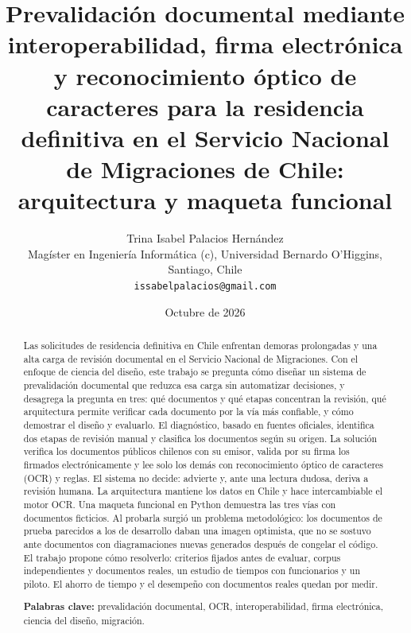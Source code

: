 \documentclass[11pt,a4paper]{article}
\title{\textbf{Prevalidación documental mediante interoperabilidad, firma electrónica y reconocimiento óptico de caracteres para la residencia definitiva en el Servicio Nacional de Migraciones de Chile: arquitectura y maqueta funcional}}
\author{Trina Isabel Palacios Hernández\\[2pt]
\small Magíster en Ingeniería Informática (c), Universidad Bernardo O'Higgins, Santiago, Chile\\
\small \texttt{issabelpalacios@gmail.com}}
\date{Octubre de 2026}
\begin{document}
\maketitle

\begin{abstract}
\noindent
Las solicitudes de residencia definitiva en Chile enfrentan demoras prolongadas y una alta carga de revisión documental en el Servicio Nacional de Migraciones. Con el enfoque de ciencia del diseño, este trabajo se pregunta cómo diseñar un sistema de prevalidación documental que reduzca esa carga sin automatizar decisiones, y desagrega la pregunta en tres: qué documentos y qué etapas concentran la revisión, qué arquitectura permite verificar cada documento por la vía más confiable, y cómo demostrar el diseño y evaluarlo. El diagnóstico, basado en fuentes oficiales, identifica dos etapas de revisión manual y clasifica los documentos según su origen. La solución verifica los documentos públicos chilenos con su emisor, valida por su firma los firmados electrónicamente y lee solo los demás con reconocimiento óptico de caracteres (OCR) y reglas. El sistema no decide: advierte y, ante una lectura dudosa, deriva a revisión humana. La arquitectura mantiene los datos en Chile y hace intercambiable el motor OCR. Una maqueta funcional en Python demuestra las tres vías con documentos ficticios. Al probarla surgió un problema metodológico: los documentos de prueba parecidos a los de desarrollo daban una imagen optimista, que no se sostuvo ante documentos con diagramaciones nuevas generados después de congelar el código. El trabajo propone cómo resolverlo: criterios fijados antes de evaluar, corpus independientes y documentos reales, un estudio de tiempos con funcionarios y un piloto. El ahorro de tiempo y el desempeño con documentos reales quedan por medir.

\medskip
\noindent\textbf{Palabras clave:} prevalidación documental, OCR, interoperabilidad, firma electrónica, ciencia del diseño, migración.
\end{abstract}
\end{document}
